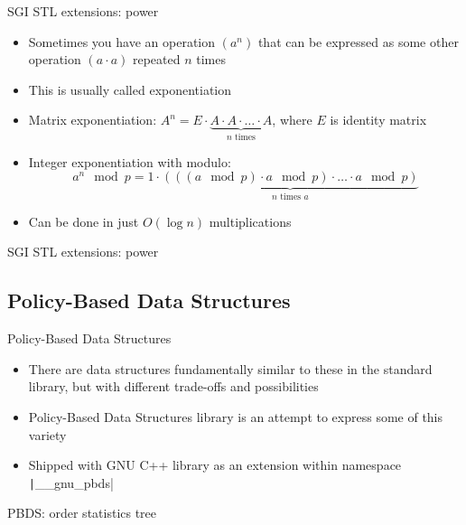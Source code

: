 \documentclass[12pt,presentation,hyperref={unicode},aspectratio=169]{beamer}
\begin{document}
\begin{frame}{SGI STL extensions: power}
  \begin{itemize}
    \item<1-> Sometimes you have an operation $(a^n)$ that can be
      expressed as some other operation $(a \cdot a)$ repeated $n$ times
    \item<2-> This is usually called exponentiation
    \item<3-> Matrix exponentiation:
      $A^n = E
        \cdot \underbrace{A \cdot A \cdot \ldots \cdot A}_{n \text{ times}}$,
        where $E$ is identity matrix
    \item<4-> Integer exponentiation with modulo: $$
      a^n \mod{p} = 1
      \cdot \underbrace{(((a \mod{p}) \cdot a \mod{p}) \cdot
      \ldots \cdot a \mod{p})}_{n\text{ times }a}
    $$
    \item<5-> Can be done in just $O(\log{n})$ multiplications
  \end{itemize}
\end{frame}

\begin{frame}[fragile]{SGI STL extensions: power}
\end{frame}


\subsection{Policy-Based Data Structures}

\begin{frame}[fragile]{Policy-Based Data Structures}
  \begin{itemize}
    \item<1-> There are data structures fundamentally similar to these in the
      standard library, but with different trade-offs and possibilities
    \item<2-> Policy-Based Data Structures library is an attempt to express
      some of this variety
    \item<3-> Shipped with GNU C++ library as an extension within namespace
      \texttt|__gnu_pbds|
  \end{itemize}
\end{frame}

\begin{frame}[fragile]{PBDS: order statistics tree}
\end{frame}
\end{document}
